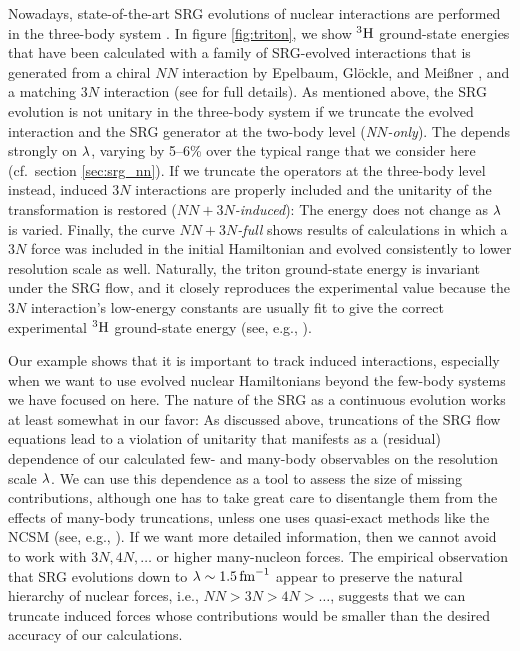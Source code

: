 Nowadays, state-of-the-art SRG evolutions of nuclear interactions are 
performed in the three-body system \cite{Jurgenson:2009bs,Jurgenson:2011zr,Jurgenson:2013fk, 
Hebeler:2012ly,Wendt:2013uq}. In figure \ref{fig:triton}, we show 
$\nuc{H}{3}$ ground-state energies that have been calculated with
a family of SRG-evolved interactions that is generated from a 
chiral \NNLO{} $NN$ interaction by Epelbaum, Gl\"ockle, and Mei\ss{}ner 
\cite{Epelbaum:2002nr,Epelbaum:2006mo},
and a matching $3N$ interaction (see \cite{Hebeler:2012ly} for
full details). As mentioned above, the SRG evolution is not unitary in 
the three-body system if we truncate the evolved interaction and
the SRG generator at the two-body level (\emph{N$N$-only}). The 
depends strongly on $\lambdaSRG$, varying by 5--6\% over the 
typical range that we consider here (cf.~section \ref{sec:srg_nn}). 
If we truncate the operators at the three-body level instead, induced 
$3N$ interactions are properly included and the unitarity of the 
transformation is restored (\emph{$NN\!+\!3N$-induced}): 
The energy does not change as $\lambdaSRG$ is varied. Finally, the 
curve \emph{$NN\!+\!3N$-full} shows results of calculations in
which a $3N$ force was included in the initial Hamiltonian and
evolved consistently to lower resolution scale as well. Naturally,
the triton ground-state energy is invariant under the SRG flow, and 
it closely reproduces the experimental value because the $3N$ interaction's 
low-energy constants are usually fit to give the correct experimental 
$\nuc{H}{3}$ ground-state energy (see, e.g., 
\cite{Epelbaum:2009ve,Machleidt:2011bh,Gazit:2009qf}).

Our example shows that it is important to track induced interactions,
especially when we want to use evolved nuclear Hamiltonians beyond
the few-body systems we have focused on here. The nature of the SRG 
as a continuous evolution works at least somewhat in our favor: As
discussed above, truncations of the SRG flow equations lead to a 
violation of unitarity that manifests as a (residual) dependence 
of our calculated few- and many-body observables on the resolution 
scale $\lambdaSRG$. We can use this dependence as a tool to assess 
the size of missing contributions, although one has to take great
care to disentangle them from the effects of many-body truncations,
unless one uses quasi-exact methods like the NCSM (see, e.g., 
\cite{Bogner:2010pq,Jurgenson:2009bs,Hebeler:2012ly,Roth:2011kx,Hergert:2013mi,Hergert:2013ij,Binder:2014fk,
Soma:2014eu,Griesshammer:2015dp}). If we want more detailed information,
then we cannot avoid to work with $3N, 4N, \ldots$ or higher many-nucleon 
forces. The empirical observation that SRG evolutions down to $\lambdaSRG\sim1.5\fmi$
appear to preserve the natural hierarchy of nuclear forces, i.e.,  
$NN > 3N > 4N > \ldots$, suggests that we can truncate induced
forces whose contributions would be smaller than the desired accuracy 
of our calculations. 

